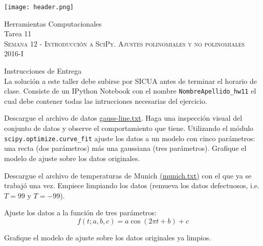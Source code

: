 \documentclass[11pt,letterpaper]{exam}
\begin{document}
\begin{center}

\texttt{[image: header.png]}

\vspace{1.0cm}
{\Large Herramientas Computacionales \\
 Tarea 11} \\
\textsc{Semana 12 - Introducción a SciPy. Ajustes polinomiales y no polinomiales}\\
2016-I\\
\end{center}



\vspace{0.5cm}

{\Large Instrucciones de Entrega}\\

\noindent
La solución a este taller debe subirse por SICUA antes de terminar 
el horario de clase.
\noindent
Consiste de un IPython Notebook con el nombre
\verb"NombreApellido_hw11"
el cual debe contener todas las intrucciones necesarias del ejercicio.

\begin{questions}


Descargue el archivo de datos 
\href{https://raw.githubusercontent.com/ComputoCienciasUniandes/HerramientasComputacionalesDatos/master/Homework/hw11/gauss_line.txt}{gauss-line.txt}.
Haga una inspección visual del conjunto de datos y observe el comportamiento que tiene. Utilizando el módulo \verb|scipy.optimize.curve_fit| ajuste los datos a un modelo con cinco parámetros: una recta (dos parámetros) más una gaussiana (tres parámetros). Grafique el modelo de ajuste sobre los datos originales.


Descargue el archivo de temperaturas de Munich 
\href{http://www2.mpia-hd.mpg.de/~robitaille/PY4SCI_SS_2014/_static/data/munich_temperatures_average_with_bad_data.txt}{(munich.txt)} con el que ya se trabajó una vez. Empiece limpiando los datos (remueva los datos defectuosos, i.e. $T=99$ y $T =-99$).

Ajuste los datos a la función de tres parámetros:
$$ f(t; a,b,c) = a \cos\left( 2\pi t + b \right) + c $$

Grafique el modelo de ajuste sobre los datos originales ya limpios.

\end{questions}
\end{document}
